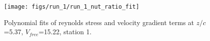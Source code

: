 \begin{figure}[H]
\centering
\texttt{[image: figs/run\_1/run\_1\_nut\_ratio\_fit]}
\caption{Polynomial fits of reynolds stress and velocity gradient terms at $z/c$=5.37, $V_{free}$=15.22, station 1.}
\label{fig:run_1_nut_ratio_fit}
\end{figure}



